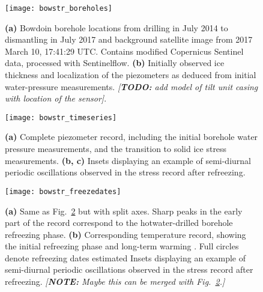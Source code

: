 \documentclass[utf8]{article}
\newcommand{\note}[1]{\textcolor{c0}{\emph{[\textbf{NOTE:} #1]}}}
\newcommand{\todo}[1]{\textcolor{c3}{\emph{[\textbf{TODO:} #1]}}}
\begin{document}
    \begin{figure}
      \centerline{\texttt{[image: bowstr\_boreholes]}}
      \caption{%
        \textbf{(a)}
          Bowdoin borehole locations from drilling in July 2014 to dismantling
          in July 2017 and background satellite image from 2017 March 10,
          17:41:29 UTC. Contains modified Copernicus Sentinel data, processed
          with Sentinelflow.
        \textbf{(b)}
          Initially observed ice thickness and localization of the piezometers
          as deduced from initial water-pressure measurements.
        \todo{add model of tilt unit casing with location of the sensor}.}
      \label{fig:boreholes}
    \end{figure}

    \begin{figure}
      \centerline{\texttt{[image: bowstr\_timeseries]}}
      \caption{%
        \textbf{(a)}
          Complete piezometer record, including the initial borehole water
          pressure measurements, and the transition to solid ice stress
          measurements.
        \textbf{(b, c)}
          Insets displaying an example of semi-diurnal periodic oscillations
          observed in the stress record after refreezing.}
      \label{fig:timeseries}
    \end{figure}

    \begin{figure}
      \centerline{\texttt{[image: bowstr\_freezedates]}}
      \caption{%
        \textbf{(a)}
          Same as Fig.~\ref{fig:timeseries} but with split axes. Sharp peaks in
          the early part of the record correspond to the hotwater-drilled
          borehole refreezing phase.
        \textbf{(b)}
          Corresponding temperature record, showing the initial refreezing
          phase and long-term warming \citep[cf.][]{Seguinot.etal.2020}.
          Full circles denote refreezing dates estimated
          Insets displaying an example of semi-diurnal periodic oscillations
          observed in the stress record after refreezing.
        \note{%
          Maybe this can be merged with Fig.~\ref{fig:timeseries}.}}
      \label{fig:freezedates}
    \end{figure}
\end{document}
